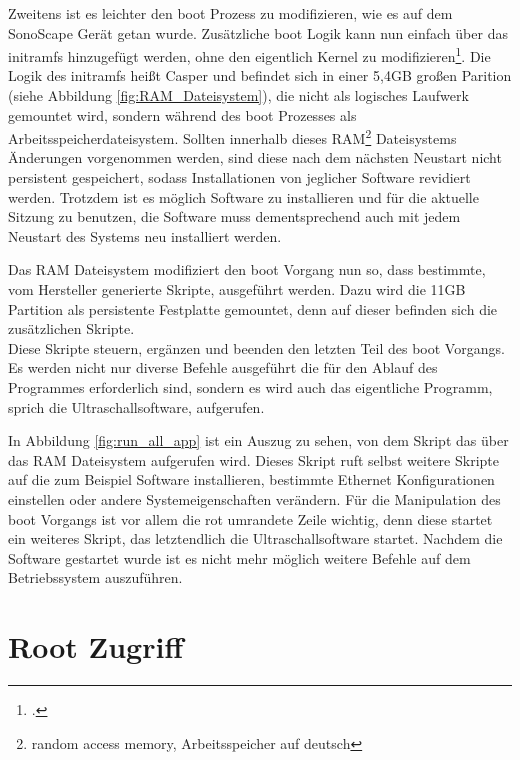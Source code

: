 Zweitens ist es leichter den boot Prozess zu modifizieren, wie es auf dem SonoScape Gerät getan wurde. Zusätzliche boot Logik kann nun einfach über das initramfs hinzugefügt werden, ohne den eigentlich Kernel zu modifizieren\footcite{initframe}.
Die Logik des initramfs heißt Casper und befindet sich in einer 5,4GB großen Parition (siehe Abbildung \ref{fig:RAM_Dateisystem}), die nicht als logisches Laufwerk gemountet wird, sondern während des boot Prozesses als Arbeitsspeicherdateisystem. Sollten innerhalb dieses RAM\footnote{random access memory, Arbeitsspeicher auf deutsch} Dateisystems Änderungen vorgenommen werden, sind diese nach dem nächsten Neustart nicht persistent gespeichert, sodass Installationen von jeglicher Software revidiert werden. Trotzdem ist es möglich Software zu installieren und für die aktuelle Sitzung zu benutzen, die Software muss dementsprechend auch mit jedem Neustart des Systems neu installiert werden.

Das RAM Dateisystem modifiziert den boot Vorgang nun so, dass bestimmte, vom Hersteller generierte  Skripte, ausgeführt werden. Dazu wird die 11GB Partition als persistente Festplatte gemountet, denn auf dieser befinden sich die zusätzlichen Skripte.\\
Diese Skripte steuern, ergänzen und beenden den letzten Teil des boot Vorgangs. Es werden nicht nur diverse Befehle ausgeführt die für den Ablauf des Programmes erforderlich sind, sondern es wird auch das eigentliche Programm, sprich die Ultraschallsoftware, aufgerufen.

In Abbildung \ref{fig:run_all_app} ist ein Auszug zu sehen, von dem Skript das über das RAM Dateisystem aufgerufen wird. Dieses Skript ruft selbst weitere Skripte auf die zum Beispiel Software installieren, bestimmte Ethernet Konfigurationen einstellen oder andere Systemeigenschaften verändern. Für die Manipulation des boot Vorgangs ist vor allem die rot umrandete Zeile wichtig, denn diese startet ein weiteres Skript, das letztendlich die Ultraschallsoftware startet. Nachdem die Software gestartet wurde ist es nicht mehr möglich weitere Befehle auf dem Betriebssystem auszuführen.\\

\section{Root Zugriff}

